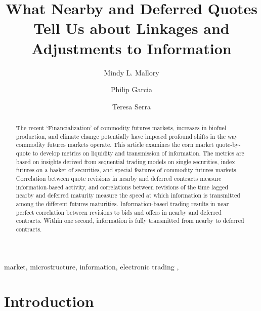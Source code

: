 \documentclass[review,12pt]{elsarticle}
\begin{document}
\begin{frontmatter}

  \title{What Nearby and Deferred Quotes Tell Us about Linkages and Adjustments
to Information}
    \author[University of Illinois]{Mindy L. Mallory}
    \author[University of Illinois]{Philip Garcia}
  
    \author[University of Illinois]{Teresa Serra}
  
      \address[University of Illinois]{Agricultural and Consumer Economics, 1301 W Gregory Dr, Urbana, IL,
61801}
  
  \begin{abstract}
  The recent `Financialization' of commodity futures markets, increases in
  biofuel production, and climate change potentially have imposed profound
  shifts in the way commodity futures markets operate. This article
  examines the corn market quote-by-quote to develop metrics on liquidity
  and transmission of information. The metrics are based on insights
  derived from sequential trading models on single securities, index
  futures on a basket of securities, and special features of commodity
  futures markets. Correlation between quote revisions in nearby and
  deferred contracts measure information-based activity, and correlations
  between revisions of the time lagged nearby and deferred maturity
  measure the speed at which information is transmitted among the
  different futures maturities. Information-based trading results in near
  perfect correlation between revisions to bids and offers in nearby and
  deferred contracts. Within one second, information is fully transmitted
  from nearby to deferred contracts.
  \end{abstract}
   \begin{keyword} market, microstructure, information, electronic trading \sep \end{keyword}
 \end{frontmatter}

\section{Introduction}\label{introduction}
\end{document}
